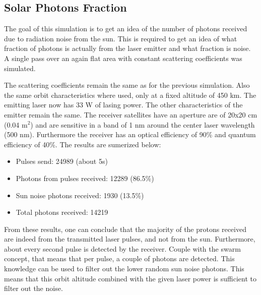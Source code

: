 \subsection{Solar Photons Fraction}
\label{sec:SolarPhotonsFraction}

The goal of this simulation is to get an idea of the number of photons received due to radiation noise from the sun. This is required to get an idea of what fraction of photons is actually from the laser emitter and what fraction is noise. A single pass over an again flat area with constant scattering coefficients was simulated.

The scattering coefficients remain the same as for the previous simulation. Also the same orbit characteristics where used, only at a fixed altitude of 450 km. The emitting \ac{laser} now has 33 W of lasing power. The other characteristics of the emitter remain the same. The receiver satellites have an aperture are of 20x20 cm (0.04 m$^2$) and are sensitive in a band of 1 nm around the center laser wavelength (500 nm). Furthermore the receiver has an optical efficiency of 90\% and quantum efficiency of 40\%. The results are sumerized below:

\begin{itemize}
	\item Pulses send: 24989 (about 5s)
	\item Photons from pulses received: 12289 (86.5\%)
	\item Sun noise photons received: 1930 (13.5\%)
	\item Total photons received: 14219
\end{itemize}

From these results, one can conclude that the majority of the protons received are indeed from the transmitted \ac{laser} pulses, and not from the sun. Furthermore, about every second pulse is detected by the receiver. Couple with the swarm concept, that means that per pulse, a couple of photons are detected. This knowledge can be used to filter out the lower random sun noise photons. This means that this orbit altitude combined with the given laser power is sufficient to filter out the noise.